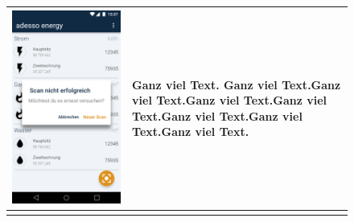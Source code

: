 \begin{figure}[h]
\begin{tabularx}{\textwidth}{X | X}
	\includegraphics[scale = 0.22]{img/AndroidMockup/imageFailed} & Ganz viel Text. Ganz viel Text.Ganz viel Text.Ganz viel Text.Ganz viel Text.Ganz viel Text.Ganz viel Text.Ganz viel Text. \\ \hline \\

\end{tabularx}
\end{figure}
